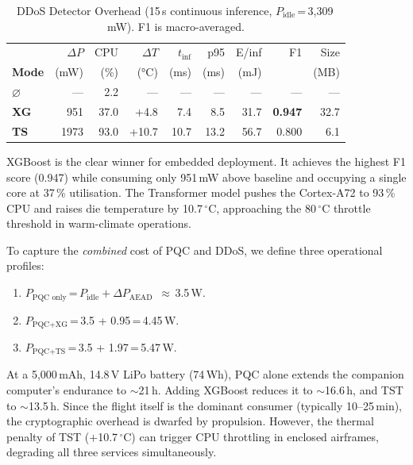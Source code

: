 \documentclass[conference]{IEEEtran}
\begin{document}
\begin{table}[t]
\centering
\caption{DDoS Detector Overhead (15\,s continuous inference,
  $P_{\text{idle}}$\,=\,3{,}309\,mW).  F1 is macro-averaged.}
\label{tab:ddos}
\footnotesize
\setlength{\tabcolsep}{3pt}
\begin{tabular}{@{}l  r r r r r r r r@{}}
\toprule
& $\Delta P$ & CPU & $\Delta T$ & $t_{\text{inf}}$ & p95 & E/inf & F1 & Size \\
\textbf{Mode} & (mW) & (\%) & (\si{\celsius}) & (ms) & (ms) & (mJ) & & (MB) \\
\midrule
$\varnothing$ & --- & 2.2 & --- & --- & --- & --- & --- & --- \\
\textbf{XG} & 951 & 37.0 & +4.8 & 7.4 & 8.5 & 31.7 & \textbf{0.947} & 32.7 \\
\textbf{TS} & 1973 & \cellcolor{worstcell}93.0 & \cellcolor{worstcell}+10.7 & 10.7 & 13.2 & 56.7 & 0.800 & 6.1 \\
\bottomrule
\end{tabular}
\end{table}

XGBoost is the clear winner for embedded deployment.  It achieves the
highest F1 score (0.947) while consuming only 951\,mW above baseline
and occupying a single core at 37\,\% utilisation.  The Transformer
model pushes the Cortex-A72 to 93\,\% CPU and raises die temperature
by 10.7\,$^\circ$C, approaching the 80\,$^\circ$C throttle threshold
in warm-climate operations.

To capture the \emph{combined} cost of PQC and DDoS, we define
three operational profiles:

\begin{enumerate}
  \item $P_{\text{PQC only}}$\,=\,$P_{\text{idle}} + \Delta P_{\text{AEAD}}$
       \,$\approx$\,3.5\,W.
  \item $P_{\text{PQC+XG}}$\,=\,3.5 + 0.95\,=\,4.45\,W.
  \item $P_{\text{PQC+TS}}$\,=\,3.5 + 1.97\,=\,5.47\,W.
\end{enumerate}

\noindent
At a 5{,}000\,mAh, 14.8\,V LiPo battery (74\,Wh), PQC alone
extends the companion computer's endurance to ${\sim}$21\,h.  Adding
XGBoost reduces it to ${\sim}$16.6\,h, and TST to ${\sim}$13.5\,h.
Since the flight itself is the dominant consumer (typically 10--25\,min),
the cryptographic overhead is dwarfed by propulsion.  However, the
thermal penalty of TST ($+$10.7\,$^\circ$C) can trigger CPU throttling
in enclosed airframes, degrading all three services simultaneously.
\end{document}
